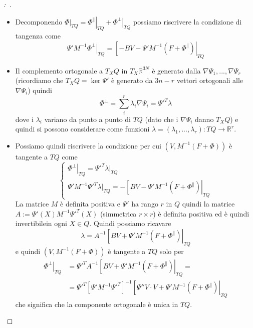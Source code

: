 \documentclass[11pt,a4paper,twoside]{book}
\newenvironment{dimo}[1][\proofname]{
	\begin{tcolorbox}[
	breakable, 
	enhanced, 
	interior hidden, 
	frame hidden, 
	borderline west = {1pt}{0pt}{gray}, 
	top=0pt, bottom=0pt, left=0pt]
\begin{proof}[#1:~]
}
{
\end{proof}
\end{tcolorbox}
}
\theoremstyle{esss}
\theoremstyle{dotless}
\numberwithin{equation}{section} %
\begin{document}
\begin{dimo}
\begin{itemize}
La $\Psi'{\scriptstyle (X)}V=0$ è automaticamente soddisfatta perchè $V\in T_XQ=\ker{\Psi'}$ e quindi la condizione perchè $\left(V,M^{-1}(F+\Phi)\right)$ sia tangente a $TQ$ è la sola 
\[
B{\scriptstyle (X,V)}V + \Psi'{\scriptstyle (X)}M^{-1}(F+\Phi){\scriptstyle (X,V)}=0 \quad \forall (X,V)\in TQ
\]
che riscriviamo come
\[
\left[ BV + \Psi' M^{-1} (F+\Phi) \right|_{TQ}=0
\]

\item Decomponendo $\left.\Phi\right|_{TQ}= \left.\Phi^\parallel\right|_{TQ} + \left.\Phi^\perp\right|_{TQ}$ possiamo riscrivere la condizione di tangenza come
\[
\Psi'M^{-1}\left.\Phi^\perp\right|_{TQ} = \left[ -BV- \Psi'M^{-1}\left(F+\Phi^\parallel\right)\right|_{TQ}
\]
\item Il complemento ortogonale a $T_XQ$ in $T_X\mathbb{R}^{3N}$ è generato dalla $\nabla\Psi_1,...,\nabla\Psi_r$ (ricordiamo che $T_XQ=\ker{\Psi'}$ è generato da $3n-r$ vettori ortogonali alle $\nabla\Psi_i$) quindi
\[
\Phi^\perp=\sum_i^{r} \lambda_i \nabla\Psi_i = \Psi'^T \lambda
\]
dove i $\lambda_i$ variano da punto a punto di $TQ$ (dato che i $\nabla\Psi_i$ danno $T_XQ$) e quindi si possono considerare come funzioni $\lambda=(\lambda_1,...,\lambda_r) :TQ\rightarrow\mathbb{R}^r$.
\item Possiamo quindi riscrivere la condizione per cui $\left(V,M^{-1}(F+\Phi)\right)$ è tangente a $TQ$ come
\[
\begin{cases}
\left.\Phi^\perp\right|_{TQ}=\Psi'^T\left.\lambda\right|_{TQ}\\
\Psi'M^{-1}\Psi'^T \left.\lambda\right|_{TQ} = -\left[BV - \Psi'M^{-1}(F+\Phi^\parallel)\right|_{TQ}
\end{cases}
\]
La matrice $M$ è definita positiva e $\Psi'$ ha rango $r$ in $Q$ quindi la matrice $A:=\Psi'(X)M^{-1}\Psi'^T(X)$ (simmetrica $r\times r$) è definita positiva ed è quindi invertibilein ogni $X\in Q$. Quindi possiamo ricavare
\[
\lambda=A^{-1} \left[ BV+\Psi'M^{-1}(F+\Phi^\parallel) \right|_{TQ}
\]
e quindi $(V,M^{-1}(F+\Phi))$ è tangente a $TQ$ solo per
\begin{equation}\label{eqReazioneVincolarePerpLagrange1}
\begin{split}
\left.\Phi^\perp\right|_{TQ} &= \Psi'^T A^{-1} \left[ BV+\Psi'M^{-1}(F+\Phi^\parallel)  \right|_{TQ} =\\
& = \Psi'^T \left[ \Psi'M^{-1}\Psi'^T \right]^{-1} \left[ \Psi''V\cdot V+\Psi'M^{-1}(F+\Phi^\parallel)  \right|_{TQ} 
\end{split} 
\end{equation}
che significa che la componente ortogonale è unica in $TQ$.
\end{itemize}
\end{dimo}
\end{document}
